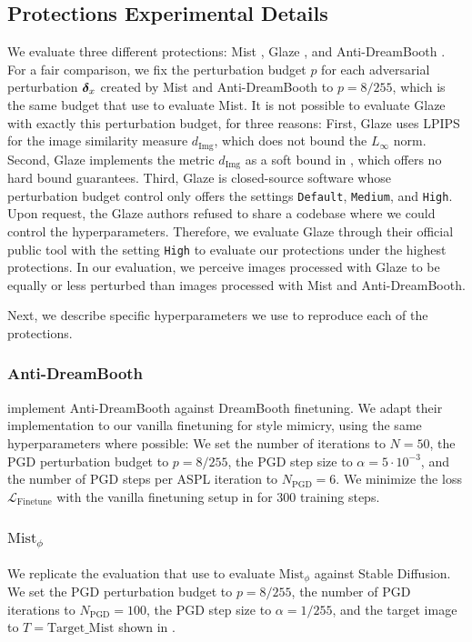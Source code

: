 \documentclass{article}
\newcommand{\loss}[0]{\mathcal{L}}
\newcommand{\mistenc}[0]{$\textrm{Mist}_{\phi}$}
\newcommand{\imgsimilarity}[0]{d_{\mathrm{Img}}}
\begin{document}
\subsection{Protections Experimental Details}
\label{sec:attackconf}
We evaluate three different protections: Mist \citep{mist}, Glaze \citep{glaze}, and Anti-DreamBooth \citep{antidreambooth}. For a fair comparison, we fix the perturbation budget $p$ for each adversarial perturbation ${\bm{\delta}}_x$ created by Mist and Anti-DreamBooth to $p = 8 / 255$, which is the same budget that \citeauthor{mist} use to evaluate Mist. It is not possible to evaluate Glaze with exactly this perturbation budget, for three reasons: First, Glaze uses LPIPS for the image similarity measure $\imgsimilarity$, which does not bound the $L_{\infty}$ norm.
Second, Glaze implements the metric $\imgsimilarity$ as a soft bound in , which offers no hard bound guarantees. Third, Glaze is closed-source software
whose perturbation budget control only offers the settings
\texttt{Default}, \texttt{Medium}, and \texttt{High}. Upon request, the Glaze authors refused to share a codebase where we could control the hyperparameters. Therefore, we evaluate Glaze through their official public tool with
the setting \texttt{High} to evaluate our protections under the highest protections. In our evaluation, we perceive images processed
with Glaze to be equally or less perturbed than images processed with Mist and Anti-DreamBooth.

Next, we describe specific hyperparameters we use to reproduce each of the protections.

\subsubsection{Anti-DreamBooth}
\label{sec:antidreamboothexp}
\citeauthor{antidreambooth} implement Anti-DreamBooth against
DreamBooth finetuning. We adapt their implementation to our vanilla finetuning for style mimicry, using the same hyperparameters where
possible: We set the number of iterations to $N = 50$,
the PGD perturbation budget to $p = 8 / 255$, the PGD step size to $\alpha = 5 \cdot 10^{-3}$, and the number of PGD steps per ASPL iteration to $N_\mathrm{PGD} = 6$. We minimize the loss
$\loss_{\mathrm{Finetune}}$ with the vanilla finetuning setup
in  for $300$ training steps.

\subsubsection{\mistenc{}}
\label{sec:mistencexp}
We replicate the evaluation that \citeauthor{misttechnical} use to evaluate
\mistenc{} against Stable Diffusion. We set the PGD perturbation budget to $p = 8 / 255$, the number of PGD iterations
to $N_\mathrm{PGD} = 100$, the PGD step size to $\alpha = 1 / 255$, and the target image to $T = \text{Target\_Mist}$ shown in .
\end{document}
